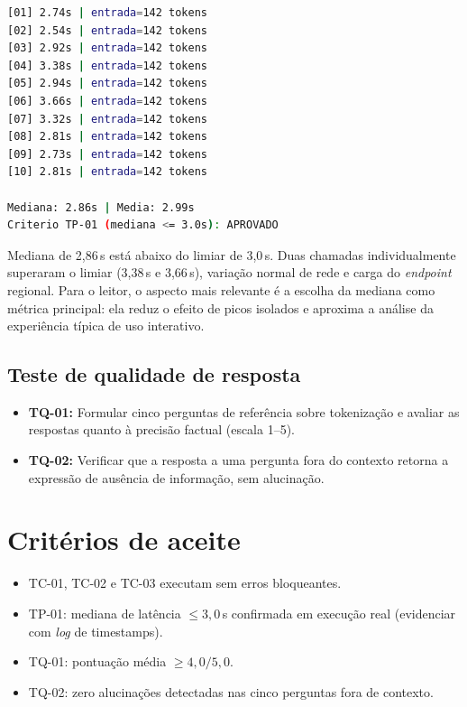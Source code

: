 \begin{lstlisting}[language=bash,
      caption={TP-01 --- lat\^encias medidas em 10 chamadas ao Bedrock.},
      label={lst:tp01_latencias}]
[01] 2.74s | entrada=142 tokens
[02] 2.54s | entrada=142 tokens
[03] 2.92s | entrada=142 tokens
[04] 3.38s | entrada=142 tokens
[05] 2.94s | entrada=142 tokens
[06] 3.66s | entrada=142 tokens
[07] 3.32s | entrada=142 tokens
[08] 2.81s | entrada=142 tokens
[09] 2.73s | entrada=142 tokens
[10] 2.81s | entrada=142 tokens

Mediana: 2.86s | Media: 2.99s
Criterio TP-01 (mediana <= 3.0s): APROVADO
\end{lstlisting}

\noindent Mediana de 2{,}86\,s est\'a abaixo do limiar de 3{,}0\,s.
Duas chamadas individualmente superaram o limiar (3{,}38\,s e 3{,}66\,s),
varia\c{c}\~ao normal de rede e carga do \textit{endpoint} regional.
Para o leitor, o aspecto mais relevante \'e a escolha da mediana como
m\'etrica principal: ela reduz o efeito de picos isolados e aproxima a
an\'alise da experi\^encia t\'ipica de uso interativo.

\subsection{Teste de qualidade de resposta}

\begin{itemize}[leftmargin=*]
  \item \textbf{TQ-01:} Formular cinco perguntas de refer\^encia
        sobre tokeniza\c{c}\~ao e avaliar as respostas quanto \`a
        precis\~ao factual (escala 1--5).
  \item \textbf{TQ-02:} Verificar que a resposta a uma pergunta
        fora do contexto retorna a express\~ao de aus\^encia de
        informa\c{c}\~ao, sem alucina\c{c}\~ao.
\end{itemize}

\section{Crit\'erios de aceite}

\begin{itemize}[leftmargin=*]
  \item TC-01, TC-02 e TC-03 executam sem erros bloqueantes.
  \item TP-01: mediana de lat\^encia $\leq 3{,}0$\,s confirmada em
        execu\c{c}\~ao real (evidenciar com \textit{log} de timestamps).
  \item TQ-01: pontua\c{c}\~ao m\'edia $\geq 4{,}0/5{,}0$.
  \item TQ-02: zero alucina\c{c}\~oes detectadas nas cinco perguntas
        fora de contexto.
\end{itemize}

